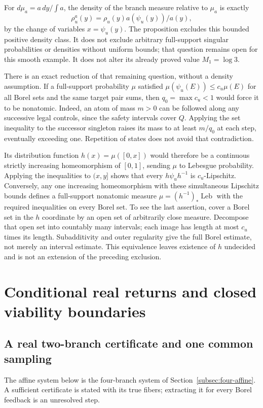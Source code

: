 \documentclass[11pt,reqno]{amsart}
\numberwithin{equation}{section}
\theoremstyle{definition}
\newcommand{\Leb}{\operatorname{Leb}}
\begin{document}
For $d\mu_a=a\,dy/\int a$, the density of the branch measure
relative to $\mu_a$ is exactly
\[
 \rho_u^a(y)=\rho_u(y)a(\psi_u(y))/a(y),
\]
by the change of variables
$x=\psi_u(y)$. The proposition excludes this bounded positive
density class. It does not exclude arbitrary full-support singular
probabilities or densities without uniform bounds; that question
remains open for this smooth example. It does not alter its already
proved value $M_1=\log3$.

There is an exact reduction of that remaining question, without a
density assumption. If a full-support probability $\mu$ satisfied
$\mu(\psi_u(E))\le c_u\mu(E)$ for all Borel sets and the
same target pair sums, then $q_0=\max c_u<1$ would force it to
be nonatomic. Indeed, an atom of mass $m>0$ can be followed along
any successive legal controls, since the safety intervals cover
$Q$. Applying the set inequality to the successor singleton raises
its mass to at least $m/q_0$ at each step, eventually exceeding
one. Repetition of states does not avoid that contradiction.

Its distribution function $h(x)=\mu([0,x])$ would therefore be a
continuous strictly increasing homeomorphism of $[0,1]$, sending
$\mu$ to Lebesgue probability. Applying the inequalities to
$(x,y]$ shows that every $h\psi_uh^{-1}$ is $c_u$-Lipschitz.
Conversely, any one increasing homeomorphism with these simultaneous
Lipschitz bounds defines a full-support nonatomic measure
$\mu=(h^{-1})_*\Leb$ with the required inequalities on every
Borel set. To see the last assertion, cover a Borel set in the
$h$ coordinate by an open set of arbitrarily close measure.
Decompose that open set into countably many intervals; each image
has length at most $c_u$ times its length. Subadditivity and
outer regularity give the full Borel estimate, not merely an
interval estimate. This equivalence leaves existence of $h$
undecided and is not an extension of the preceding exclusion.

\section{Conditional real returns and closed viability boundaries}
\label{app:returns}

\subsection{A real two-branch certificate and one common sampling}
The affine system below is the four-branch system of
Section~\ref{subsec:four-affine}. A sufficient certificate is stated
with its true fibers; extracting it for every Borel feedback is an
unresolved step.
\end{document}
